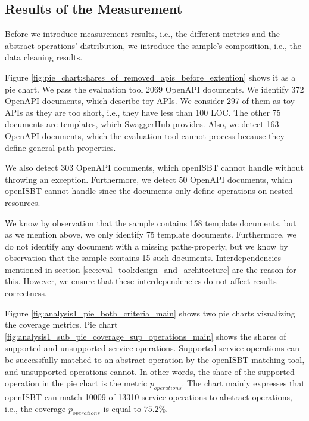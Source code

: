 \subsection{Results of the Measurement}
\label{sec:analysis_1:results}

Before we introduce measurement results, i.e., the different metrics and the abstract operations' distribution,  we introduce the sample's composition, i.e., the data cleaning results. 

\FloatBarrier
Figure \ref{fig:pie_chart:shares_of_removed_apis_before_extention} shows it as a pie chart. We pass the evaluation tool 2069 OpenAPI documents.
We identify 372 OpenAPI documents, which describe toy APIs. We consider 297 of them as toy APIs as they are too short, i.e., they have less than 100 LOC. The other 75 documents are templates, which SwaggerHub provides. Also, we detect 163 OpenAPI documents, which the evaluation tool cannot process because they define general path-properties. 

We also detect 303 OpenAPI documents, which openISBT cannot handle without throwing an exception. Furthermore, we detect 50 OpenAPI documents, which openISBT cannot handle since the documents only define operations on nested resources.

We know by observation that the sample contains 158 template documents, but as we mention above, we only identify 75 template documents. Furthermore, we do not identify any document with a missing paths-property, but we know by observation that the sample contains 15 such documents. Interdependencies mentioned in section \ref{sec:eval_tool:design_and_architecture} are the reason for this. However, we ensure that these interdependencies do not affect results correctness. 


Figure \ref{fig:analysis1_pie_both_criteria_main} shows two pie charts visualizing the coverage metrics.
Pie chart \ref{fig:analysis1_sub_pie_coverage_sup_operations_main} shows the shares of supported and unsupported service operations. Supported service operations can be successfully matched to an abstract operation by the openISBT matching tool, and unsupported operations cannot. In other words, the share of the supported operation in the pie chart is the metric $p_{operations}$. The chart mainly expresses that openISBT can match 10009 of 13310 service operations to abstract operations, i.e., the coverage $p_{operations}$ is equal to $75.2\%$.

